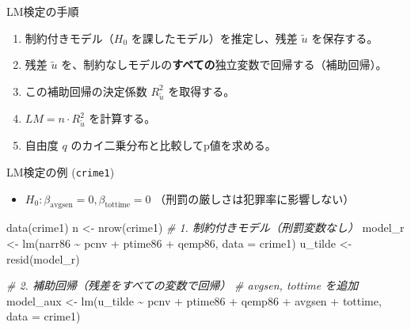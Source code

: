 \documentclass[
  ignorenonframetext,
]{beamer}
\newenvironment{Shaded}{\begin{snugshade}}{\end{snugshade}}
\newcommand{\AttributeTok}[1]{\textcolor[rgb]{0.77,0.63,0.00}{#1}}
\newcommand{\CommentTok}[1]{\textcolor[rgb]{0.56,0.35,0.01}{\textit{#1}}}
\newcommand{\FunctionTok}[1]{\textcolor[rgb]{0.00,0.00,0.00}{#1}}
\newcommand{\NormalTok}[1]{#1}
\newcommand{\OtherTok}[1]{\textcolor[rgb]{0.56,0.35,0.01}{#1}}
\newcommand{\SpecialCharTok}[1]{\textcolor[rgb]{0.00,0.00,0.00}{#1}}
\providecommand{\tightlist}{%
  \setlength{\itemsep}{0pt}\setlength{\parskip}{0pt}}
\begin{document}
\begin{frame}{LM検定の手順}
\protect\hypertarget{lmux691cux5b9aux306eux624bux9806}{}
\begin{enumerate}
\tightlist
\item
  制約付きモデル（\(H_0\) を課したモデル）を推定し、残差 \(\tilde{u}\)
  を保存する。
\item
  残差 \(\tilde{u}\)
  を、制約なしモデルの\textbf{すべての}独立変数で回帰する（補助回帰）。
\item
  この補助回帰の決定係数 \(R^2_{\tilde{u}}\) を取得する。
\item
  \(LM = n \cdot R^2_{\tilde{u}}\) を計算する。
\item
  自由度 \(q\) のカイ二乗分布と比較してp値を求める。
\end{enumerate}
\end{frame}

\begin{frame}[fragile]{LM検定の例 (\texttt{crime1})}
\protect\hypertarget{lmux691cux5b9aux306eux4f8b-crime1}{}
\begin{itemize}
\tightlist
\item
  \(H_0: \beta_{\text{avgsen}} = 0, \beta_{\text{tottime}} = 0\)
  （刑罰の厳しさは犯罪率に影響しない）
\end{itemize}

\begin{Shaded}
\begin{Highlighting}[]
\FunctionTok{data}\NormalTok{(crime1)}
\NormalTok{n }\OtherTok{\textless{}{-}} \FunctionTok{nrow}\NormalTok{(crime1)}
\CommentTok{\# 1. 制約付きモデル（刑罰変数なし）}
\NormalTok{model\_r }\OtherTok{\textless{}{-}} \FunctionTok{lm}\NormalTok{(narr86 }\SpecialCharTok{\textasciitilde{}}\NormalTok{ pcnv }\SpecialCharTok{+}\NormalTok{ ptime86 }\SpecialCharTok{+}\NormalTok{ qemp86, }
              \AttributeTok{data =}\NormalTok{ crime1)}
\NormalTok{u\_tilde }\OtherTok{\textless{}{-}} \FunctionTok{resid}\NormalTok{(model\_r)}

\CommentTok{\# 2. 補助回帰（残差をすべての変数で回帰）}
\CommentTok{\# avgsen, tottime を追加}
\NormalTok{model\_aux }\OtherTok{\textless{}{-}} \FunctionTok{lm}\NormalTok{(u\_tilde }\SpecialCharTok{\textasciitilde{}}\NormalTok{ pcnv }\SpecialCharTok{+}\NormalTok{ ptime86 }\SpecialCharTok{+}\NormalTok{ qemp86 }\SpecialCharTok{+} 
\NormalTok{                avgsen }\SpecialCharTok{+}\NormalTok{ tottime, }\AttributeTok{data =}\NormalTok{ crime1)}
\end{Highlighting}
\end{Shaded}
\end{frame}
\end{document}
